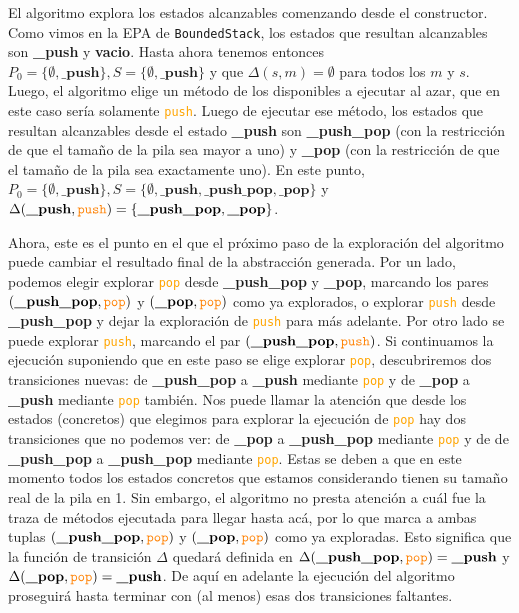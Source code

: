 El algoritmo explora los estados alcanzables comenzando desde el constructor.
Como vimos en la EPA de \texttt{BoundedStack}, los estados que resultan alcanzables son \textbf{\_push} y \textbf{vacio}.
Hasta ahora tenemos entonces $P_0 = \{\emptyset, \textbf{\_push}\}, S = \{\emptyset, \textbf{\_push}\}$ y que  $\Delta(s,m) = \emptyset$ para todos los $m$ y $s$.
Luego, el algoritmo elige un método de los disponibles a ejecutar al azar, que en este caso sería solamente \textcolor{orange}{\texttt{push}}.
Luego de ejecutar ese método, los estados que resultan alcanzables desde el estado \textbf{\_push} son \textbf{\_push\_pop} (con la restricción de que el tamaño de la pila sea mayor a uno) y \textbf{\_pop} (con la restricción de que el tamaño de la pila sea exactamente uno).
En este punto, $P_0 = \{\emptyset, \textbf{\_push}\}, S = \{\emptyset, \textbf{\_push}, \textbf{\_push\_pop}, \textbf{\_pop}\}$ y  $\Delta(\textbf{\_push},\textcolor{orange}{\texttt{push}}) = \{\textbf{\_push\_pop}, \textbf{\_pop}\}$.

Ahora, este es el punto en el que el próximo paso de la exploración del algoritmo puede cambiar el resultado final de la abstracción generada.
Por un lado, podemos elegir explorar \textcolor{orange}{\texttt{pop}} desde \textbf{\_push\_pop} y \textbf{\_pop}, marcando los pares $(\textbf{\_push\_pop},\textcolor{orange}{\texttt{pop}})$ y $(\textbf{\_pop},\textcolor{orange}{\texttt{pop}})$ como ya explorados, o explorar \textcolor{orange}{\texttt{push}} desde \textbf{\_push\_pop} y dejar la exploración de \textcolor{orange}{\texttt{push}} para más adelante.
Por otro lado se puede explorar \textcolor{orange}{\texttt{push}}, marcando el par $(\textbf{\_push\_pop},\textcolor{orange}{\texttt{push}})$.
Si continuamos la ejecución suponiendo que en este paso se elige explorar \textcolor{orange}{\texttt{pop}}, descubriremos dos transiciones nuevas: de \textbf{\_push\_pop} a \textbf{\_push} mediante \textcolor{orange}{\texttt{pop}} y de \textbf{\_pop} a \textbf{\_push} mediante \textcolor{orange}{\texttt{pop}} también.
Nos puede llamar la atención que desde los estados (concretos) que elegimos para explorar la ejecución de \textcolor{orange}{\texttt{pop}} hay dos transiciones que no podemos ver: de \textbf{\_pop} a \textbf{\_push\_pop} mediante \textcolor{orange}{\texttt{pop}} y de de \textbf{\_push\_pop} a \textbf{\_push\_pop} mediante \textcolor{orange}{\texttt{pop}}.
Estas se deben a que en este momento todos los estados concretos que estamos considerando tienen su tamaño real de la pila en 1.
Sin embargo, el algoritmo no presta atención a cuál fue la traza de métodos ejecutada para llegar hasta acá, por lo que marca a ambas tuplas $(\textbf{\_push\_pop},\textcolor{orange}{\texttt{pop}})$ y $(\textbf{\_pop},\textcolor{orange}{\texttt{pop}})$ como ya exploradas.
Esto significa que la función de transición $\Delta$ quedará definida en $\Delta(\textbf{\_push\_pop},\textcolor{orange}{\texttt{pop}}) = \textbf{\_push}$ y $\Delta(\textbf{\_pop},\textcolor{orange}{\texttt{pop}}) = \textbf{\_push}$.
De aquí en adelante la ejecución del algoritmo proseguirá hasta terminar con (al menos) esas dos transiciones faltantes.


